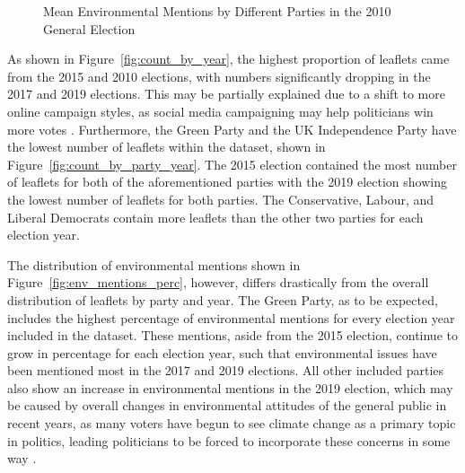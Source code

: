 \documentclass[preprint]{elsarticle} %
\begin{document}
\begin{figure}[htbp]
	\caption{Mean Environmental Mentions by Different Parties in the 2010 General Election}
	\label{fig:parties_environmental_mentions}
\end{figure}




As shown in Figure~\ref{fig:count_by_year}, the highest proportion of leaflets came from the 2015 and 2010 elections, with numbers significantly dropping in the 2017 and 2019 elections. This may be partially explained due to a shift to more online campaign styles, as social media campaigning may help politicians win more votes \citep{brightDoesCampaigningSocial2020}. Furthermore, the Green Party and the UK Independence Party have the lowest number of leaflets within the dataset, shown in Figure~\ref{fig:count_by_party_year}. The 2015 election contained the most number of leaflets for both of the aforementioned parties with the 2019 election showing the lowest number of leaflets for both parties. The Conservative, Labour, and Liberal Democrats contain more leaflets than the other two parties for each election year.  

The distribution of environmental mentions shown in Figure~\ref{fig:env_mentions_perc}, however, differs drastically from the overall distribution of leaflets by party and year. The Green Party, as to be expected, includes the highest percentage of environmental mentions for every election year included in the dataset. These mentions, aside from the 2015 election, continue to grow in percentage for each election year, such that environmental issues have been mentioned most in the 2017 and 2019 elections. All other included parties also show an increase in environmental mentions in the 2019 election, which may be caused by overall changes in environmental attitudes of the general public in recent years, as many voters have begun to see climate change as a primary topic in politics, leading politicians to be forced to incorporate these concerns in some way \citep{burnsWillBrexitDegrade2020}.



\end{document}
